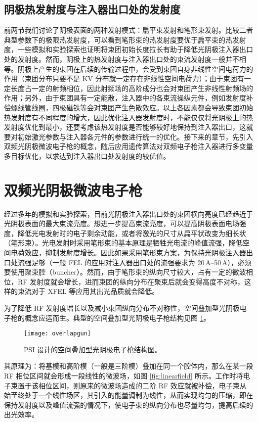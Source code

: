 \subsection{阴极热发射度与注入器出口处的发射度}
前两节我们讨论了阴极表面的两种发射模式：扁平束发射和笔形束发射。比较二者典型参数下的极限热发射度，可以看到笔形束的热发射度要优于扁平束的热发射度，一些模拟和实验探索也证明将束团初始长度拉长有助于降低光阴极注入器出口处的发射度。然而，阴极上的热发射度与注入器出口处的束流发射度一般并不相等。阴极上产生的束团在后续的传输过程中，会受到束团自身非线性空间电荷力的作用（束团分布只要不是 KV 分布就一定存在非线性空间电荷力）；由于束团有一定长度占一定的射频相位，因此射频场的高阶成分也会对束团产生非线性射频场的作用；另外，由于束团具有一定能散，注入器中的各束流操纵元件，例如发射度补偿螺线管线圈，四极磁铁等会对束团产生色散效应。以上各因素都会导致束团初始热发射度有不同程度的增大，因此优化注入器发射度时，不能仅仅将光阴极上的热发射度优化到最小，还要考虑该热发射度是否能够较好地保持到注入器出口，这就要对初始激光参数与注入器各元件的参数进行统一的优化。接下来的章节，先引入双频光阴极微波电子枪的概念，随后应用遗传算法对双频电子枪注入器进行多变量多目标优化，以求达到注入器出口处发射度的较优值。

\section{双频光阴极微波电子枪}
经过多年的模拟和实验探索，目前光阴极注入器出口处的束团横向亮度已经趋近于光阴极表面的最大束流亮度。想进一步提高束流亮度，可以提高阴极表面电场强度，降低光电发射时的电子剩余动能，或者将激光的尺寸从扁平状改变为细长状（笔形束）。光电发射时采用笔形束的基本原理是牺牲光电流的峰值流强，降低空间电荷效应，抑制发射度增长。因此如果采用笔形束方案，为保持光阴极注入器出口处流强足够（一般 FEL 的应用对注入器出口处的流强要求为 20\,A--50\,A），必须要使用聚束腔（buncher）。然而，由于笔形束的纵向尺寸较大，占有一定的微波相位，RF 发射度就会增长，进而束团的纵向分布在聚束后就会变得高度不对称，这样的束流对于 XFEL 等应用其出光品质就会降低。

为了降低 RF 发射度增长以及减小束团纵向分布不对称性，空间叠加型光阴极电子枪的概念应运而生。典型的空间叠加型光阴极电子枪结构见图 \ref{fig:overlapgun}。

\begin{figure}[htbp]
\centering
\texttt{[image: overlapgun]}
\caption{\label{fig:overlapgun} PSI 设计的空间叠加型光阴极电子枪结构图。}
\end{figure}

其原理为：将基模和高阶模（一般是三阶模）叠加在同一个腔体内，那么在某一段 RF 相位区间就会形成一段线性的微波场，如图 \ref{fig:linearfield} 所示。工作时将电子束置于该相位区间，则原来的微波场造成的二阶 RF 效应就被补偿，电子束从始至终处于一个线性场区，其引入的能量调制为线性，从而实现均匀的压缩，即在保持发射度以及峰值流强的情况下，使电子束的纵向分布也尽量均匀，提高后续的出光效率。

